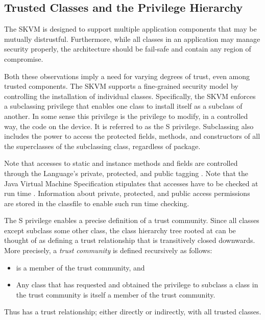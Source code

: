 \documentclass{llncs}
\begin{document}
\subsection{Trusted Classes and the Privilege Hierarchy}

The SKVM is designed to support multiple application components
that may be mutually distrustful. Furthermore, while all classes
in an application may manage security properly, the architecture
should be fail-safe and contain any region of compromise.

Both these observations imply a need for varying degrees of trust,
even among trusted components. The SKVM supports a fine-grained
security model by controlling the installation of individual classes.
Specifically, the SKVM enforces a subclassing privilege that enables
one class to install itself as a subclass of another. In some sense
this privilege is the privilege to modify, in a controlled way, the
code on the device. It is referred to as the S privilege. Subclassing
also includes the power to access the protected fields, methods,
and constructors of all the superclasses of the subclassing class,
regardless of package.

Note that accesses to static and instance methods and fields are
controlled through the Language's private, protected, and public
tagging \cite[section 6.6]{jls}. Note that the Java Virtual Machine
Specification stipulates that accesses have to be checked at run
time \cite[sections 5.4.3 and 5.4.4]{jvms}. Information about private,
protected, and public access permissions are stored in the classfile
\cite[sections 4.5 and 4.6]{jvms} to enable such run time checking.

The S privilege enables a precise definition of a trust community.
Since all classes except  subclass some other
class, the class hierarchy tree rooted at  can be thought
of as defining a trust relationship that is transitively closed
downwards. More precisely, a \emph{trust community} is defined recursively
as follows:

\begin{itemize}
  \item {} is a member of the trust community, and
  \item Any class that has requested and obtained the privilege to
  subclass a class in the trust community is itself a member
  of the trust community.
\end{itemize}

Thus  has a trust relationship; either directly or indirectly,
with all trusted classes.
\end{document}
